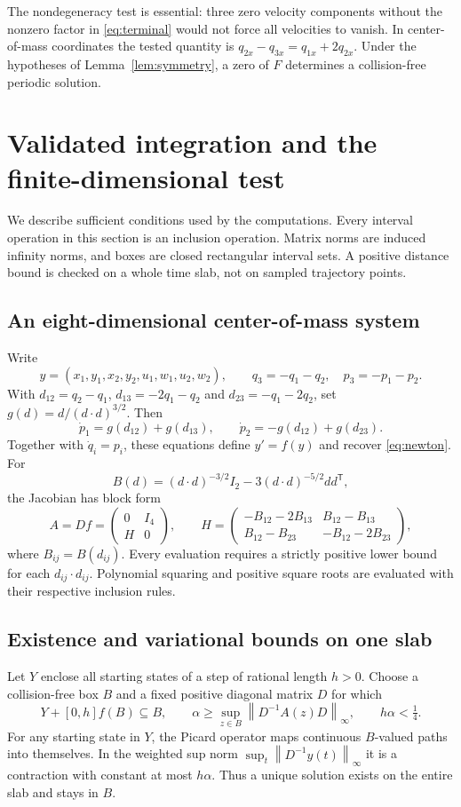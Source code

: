 \documentclass[10pt,a4paper]{article}
\theoremstyle{remark}
\newcommand{\norm}[1]{\left\lVert #1\right\rVert_\infty}
\begin{document}
The nondegeneracy test is essential: three zero velocity components
without the nonzero factor in \eqref{eq:terminal} would not force all
velocities to vanish. In center-of-mass coordinates the tested quantity
is $q_{2x}-q_{3x}=q_{1x}+2q_{2x}$. Under the hypotheses of
Lemma~\ref{lem:symmetry}, a zero of $F$ determines a collision-free
periodic solution.

\section{Validated integration and the finite-dimensional test}
\label{sec:method}
We describe sufficient conditions used by the computations. Every
interval operation in this section is an inclusion operation. Matrix
norms are induced infinity norms, and boxes are closed rectangular
interval sets. A positive distance bound is checked on a whole time
slab, not on sampled trajectory points.

\subsection{An eight-dimensional center-of-mass system}
Write
\[
 y=(x_1,y_1,x_2,y_2,u_1,w_1,u_2,w_2),
 \qquad q_3=-q_1-q_2,\quad p_3=-p_1-p_2.
\]
With $d_{12}=q_2-q_1$, $d_{13}=-2q_1-q_2$ and
$d_{23}=-q_1-2q_2$, set $g(d)=d/(d\cdot d)^{3/2}$. Then
\[
 \dot p_1=g(d_{12})+g(d_{13}),\qquad
 \dot p_2=-g(d_{12})+g(d_{23}).
\]
Together with $\dot q_i=p_i$, these equations define $y'=f(y)$ and
recover \eqref{eq:newton}. For
\[
 B(d)=(d\cdot d)^{-3/2}I_2-3(d\cdot d)^{-5/2}dd^{\mathsf T},
\]
the Jacobian has block form
\begin{equation}
 A=Df=\begin{pmatrix}0&I_4\\H&0\end{pmatrix},\qquad
 H=\begin{pmatrix}
 -B_{12}-2B_{13}& B_{12}-B_{13}\\
 B_{12}-B_{23}&-B_{12}-2B_{23}
 \end{pmatrix},
 \label{eq:jacobian}
\end{equation}
where $B_{ij}=B(d_{ij})$. Every evaluation requires a strictly positive
lower bound for each $d_{ij}\cdot d_{ij}$. Polynomial squaring and
positive square roots are evaluated with their respective inclusion
rules.

\subsection{Existence and variational bounds on one slab}
Let $Y$ enclose all starting states of a step of rational length $h>0$.
Choose a collision-free box $B$ and a fixed positive diagonal matrix
$D$ for which
\begin{equation}
 Y+[0,h]f(B)\subseteq B,\qquad
 \alpha\ge\sup_{z\in B}\norm{D^{-1}A(z)D},\qquad h\alpha<\tfrac14.
 \label{eq:picard}
\end{equation}
For any starting state in $Y$, the Picard operator maps continuous
$B$-valued paths into themselves. In the weighted sup norm
$\sup_t\norm{D^{-1}y(t)}$ it is a contraction with constant at most
$h\alpha$. Thus a unique solution exists on the entire slab and stays
in $B$.
\end{document}
